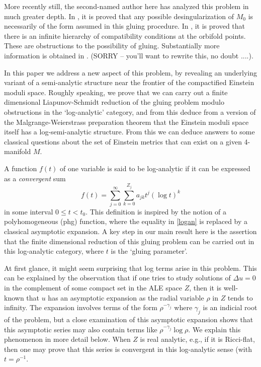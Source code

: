 \documentclass[12pt]{article}
\begin{document}
More recently still, the second-named author here has analyzed this problem in much greater depth. In \cite{Oz1},
\cite{Oz2} it is proved that any possible desingularization of $M_0$ is necessarily of the form assumed in
this gluing procedure. In \cite{Oz3}, it is proved that there is an infinite hierarchy of compatibility conditions 
at the orbifold points. These are obstructions to the possibility of gluing.  Substantially more information
is obtained in \cite{Oz4}.  (SORRY -- you'll want to rewrite this, no doubt ....).

In this paper we address a new aspect of this problem, by revealing an underlying variant of a semi-analytic
structure near the frontier of the compactified Einstein moduli space.  Roughly speaking, we prove
that we can carry out a finite dimensional Liapunov-Schmidt reduction of the gluing problem modulo 
obstructions in the `log-analytic' category, and from this deduce from a version of the Malgrange-Weierstrass preparation
theorem that the Einstein moduli space itself has a log-semi-analytic structure.  From this we 
can deduce answers to some classical questions about the set of Einstein metrics that can exist on a given 4-manifold $M$.

A function $f(t)$ of one variable is said to be log-analytic if it can be expressed as a \emph{convergent} sum
\begin{equation}
f(t) = \sum_{j=0}^\infty \sum_{k=0}^{Z_j}  a_{jk} t^j (\log t)^k
\label{logan}
\end{equation}
in some interval $0 \leq t < t_0$. This definition is inspired by the notion of a polyhomogeneous (phg) function,
where the equality in \eqref{logan} is replaced by a classical asymptotic expansion.   A key step in
our main result here is the assertion that the finite dimensional reduction of this gluing problem can
be carried out in this log-analytic category, where $t$ is the `gluing parameter'. 

At first glance, it might seem surprising that log terms arise in this problem.  This can be explained by
the observation that if one tries to study solutions of $\Delta u = 0$ in the complement of some compact
set in the ALE space $Z$, then it is well-known that $u$ has an asymptotic expansion as the radial variable 
$\rho$ in $Z$ tends to infinity.  The expansion involves terms of the form $\rho^{-\gamma_j}$ where
$\gamma_j$ is an indicial root of the problem, but a close examination of this asymptotic expansion shows that 
this asymptotic series may also contain terms like $\rho^{-\gamma_j} \log \rho$.  We explain this 
phenomenon in more detail below.  When $Z$ is real analytic, e.g., if it is Ricci-flat, then one may
prove that this series is convergent in this log-analytic sense (with $t = \rho^{-1}$. 
\end{document}
